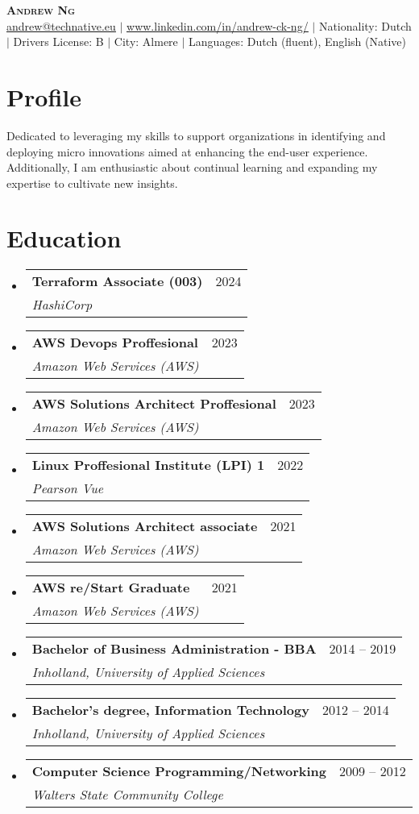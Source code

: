\documentclass[letterpaper,11pt]{article}
\makeatletter
\newcommand{\resumeSubheading}[4]{
  \vspace{-2pt}\item
    \begin{tabular*}{0.97\textwidth}[t]{l@{\extracolsep{\fill}}r}
      \textbf{#1} & #2 \\
      \textit{\small#3} & \textit{\small #4} \\
    \end{tabular*}\vspace{-7pt}
}
\newcommand{\resumeSubHeadingListStart}{\begin{itemize}[leftmargin=0.15in, label={}]}
\newcommand{\resumeSubHeadingListEnd}{\end{itemize}}
\makeatother
\begin{document}

\begin{center}
    \textbf{\Huge \scshape Andrew Ng} \\ \vspace{1pt}
    \href{mailto:x@x.com}{\underline{andrew@technative.eu}} $|$ 
    \href{https://linkedin.com/in/...}{\underline{www.linkedin.com/in/andrew-ck-ng/}} $|$
    \small Nationality: Dutch $|$ 
    {\small{Drivers License: B}} $|$  {\small{City: Almere}} $|$  
    {\small{Languages: Dutch (fluent), English (Native) }}
\end{center}

\section{Profile}
{\small{Dedicated to leveraging my skills to support organizations in identifying and deploying micro innovations aimed at enhancing the end-user experience. Additionally, I am enthusiastic about continual learning and expanding my expertise to cultivate new insights.}}

\section{Education}
  \resumeSubHeadingListStart
    \resumeSubheading
      {Terraform Associate (003)}{2024}
      {HashiCorp}{}
    \resumeSubheading
      {AWS Devops Proffesional}{2023}
      {Amazon Web Services (AWS)}{}
    \resumeSubheading
      {AWS Solutions Architect Proffesional}{2023}
      {Amazon Web Services (AWS)}{}
    \resumeSubheading
      {Linux Proffesional Institute (LPI) 1}{2022}
      {Pearson Vue}{}
    \resumeSubheading
      {AWS Solutions Architect associate}{2021}
      {Amazon Web Services (AWS)}{}
    \resumeSubheading
      {AWS re/Start Graduate}{2021}
      {Amazon Web Services (AWS)}{}
    \resumeSubheading
      {Bachelor of Business Administration - BBA}{2014 -- 2019}
      {Inholland, University of Applied Sciences}{}
    \resumeSubheading
      {Bachelor's degree, Information Technology}{2012 -- 2014}
      {Inholland, University of Applied Sciences}{}
    \resumeSubheading
      {Computer Science Programming/Networking}{ 2009 -- 2012}
      {Walters State Community College}{}
  \resumeSubHeadingListEnd
\end{document}
